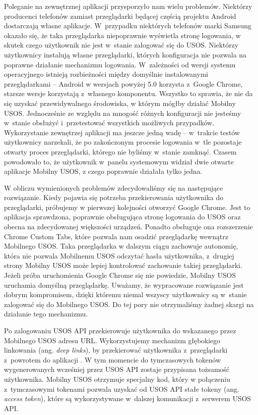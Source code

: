 \documentclass{pracamgr}
\begin{document}
Poleganie na zewnętrznej aplikacji przysporzyło nam wielu problemów. Niektórzy
producenci telefonów zamiast przeglądarki będącej częścią projektu Android
dostarczają własne aplikacje. W~przypadku niektórych telefonów marki Samsung
okazało się, że taka przeglądarka niepoprawnie wyświetla stronę logowania, w
skutek czego użytkownik nie jest w~stanie zalogować się do USOS. Niektórzy
użytkownicy instalują własne przeglądarki, których konfiguracja nie pozwala na
poprawne działanie mechanizmu logowania. W~zależności od wersji systemu operacyjnego
istnieją rozbieżności między domyślnie instalowanymi przeglądarkami -- Android w
wersjach powyżej 5.0 korzysta z~Google Chrome, starsze wersje korzystają z~własnego
komponentu. Wszystko to sprawia, że nie da się uzyskać przewidywalnego środowiska,
w którym mógłby działać Mobilny USOS. Jednocześnie ze względu na mnogość różnych
konfiguracji nie jesteśmy w~stanie obsłużyć i~przetestować wszystkich możliwych
przypadków. Wykorzystanie zewnętrzej aplikacji ma jeszcze jedną wadę -- w~trakcie
testów użytkownicy narzekali, że po zakończonym procesie logowania w~tle pozostaje
otwarty proces przeglądarki, którego nie byliśmy w~stanie zamknąć. Czasem powodowało
to, że użytkownik w~panelu systemowym widział dwie otwarte aplikacje Mobilny USOS,
z czego poprawnie działała tylko jedna.

W obliczu wymienionych problemów zdecydowaliśmy się na następujące rozwiązanie.
Kiedy pojawia się potrzeba przekierowania użytkownika do przeglądarki, próbujemy
w pierwszej kolejności otworzyć Google Chrome. Jest to aplikacja sprawdzona,
poprawnie obsługująca stronę logowania do USOS oraz obecna na zdecydowanej
większości urządzeń. Ponadto obsługuje ona rozszerzenie Chrome Custom Tabs, które
pozwala nam osadzić przeglądarkę wewnątrz Mobilnego USOS. Taka przeglądarka w
dalszym ciągu zachowuje autonomię, która nie pozwala Mobilnemu USOS odczytać
hasła użytkownika, z~drugiej strony Mobilny USOS może lepiej kontrolować zachowanie
takiej przeglądarki. Jeżeli próba uruchomienia Google Chrome się nie powiedzie,
Mobilny USOS uruchamia domyślną przeglądarkę. Uważamy, że wypracowane rozwiązanie
jest dobrym kompromisem, dzięki któremu niemal wszyscy użytkownicy są w~stanie
zalogować się do Mobilnego USOS. Do tej pory nie otrzymaliśmy żadnej skargi na
działanie tego mechanizmu.

Po zalogowaniu USOS API przekierowuje użytkownika do wskazanego przez Mobilnego USOS
adresu URL. Wykorzystujemy mechanizm głębokiego linkowania (ang. \textit{deep links}),
by przekierować użytkownika z~przeglądarki z~powrotem do aplikacji \cite{deeplinks}.
W tym momencie do tymczasowych tokenów wygenerowanych wcześniej przez USOS API zostaje
przypisana tożsamość użytkownika. Mobilny USOS otrzymuje specjalny kod, który w
połączeniu z~tymczasowymi tokenami pozwala uzyskać od USOS API stałe tokeny (ang.
\textit{access token}), które są wykorzystywane w~dalszej komunikacji z~serwerem
USOS API.
\end{document}
